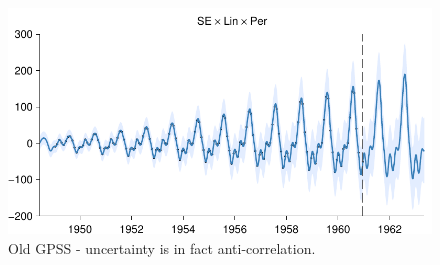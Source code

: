 \documentclass{article}
\begin{document}
\begin{figure}[h]
\centering
\includegraphics[width=0.98\columnwidth]{figures/old-gpss/01-airline-months_2}
\caption{Old GPSS - uncertainty is in fact anti-correlation.}
\label{fig:anti_corr_2}
\end{figure}
\end{document}
